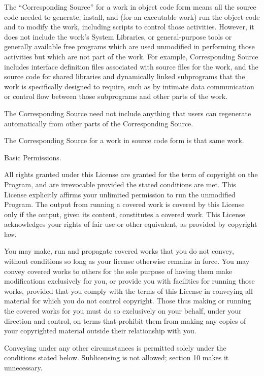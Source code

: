 The ``Corresponding Source'' for a work in object code form means all the source code needed to generate, install, and (for an executable work) run the object code and to modify the work, including scripts to control those activities.  However, it does not include the work's System Libraries, or general-purpose tools or generally available free programs which are used unmodified in performing those activities but which are not part of the work.  For example, Corresponding Source includes interface definition files associated with source files for the work, and the source code for shared libraries and dynamically linked subprograms that the work is specifically designed to require, such as by intimate data communication or control flow between those subprograms and other parts of the work.

The Corresponding Source need not include anything that users can regenerate automatically from other parts of the Corresponding Source.

The Corresponding Source for a work in source code form is that same work.

\item Basic Permissions.

All rights granted under this License are granted for the term of copyright on the Program, and are irrevocable provided the stated conditions are met.  This License explicitly affirms your unlimited permission to run the unmodified Program.  The output from running a covered work is covered by this License only if the output, given its content, constitutes a covered work.  This License acknowledges your rights of fair use or other equivalent, as provided by copyright law.

You may make, run and propagate covered works that you do not convey, without conditions so long as your license otherwise remains in force.  You may convey covered works to others for the sole purpose of having them make modifications exclusively for you, or provide you with facilities for running those works, provided that you comply with the terms of this License in conveying all material for which you do not control copyright.  Those thus making or running the covered works for you must do so exclusively on your behalf, under your direction and control, on terms that prohibit them from making any copies of your copyrighted material outside their relationship with you.

Conveying under any other circumstances is permitted solely under the conditions stated below.  Sublicensing is not allowed; section 10 makes it unnecessary. 

